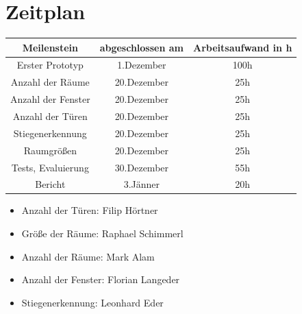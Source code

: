 \documentclass[deutsch]{scrartcl}
\begin{document}
\section{Zeitplan}
\begin{table}[h!]
	\centering
		\begin{tabular}{|c|c|c|}
		\hline
		Meilenstein & abgeschlossen am & Arbeitsaufwand in h\\
		\hline
		Erster Prototyp & 1.Dezember & 100h\\
		Anzahl der Räume & 20.Dezember & 25h\\
		Anzahl der Fenster & 20.Dezember & 25h\\
		Anzahl der Türen & 20.Dezember & 25h\\
		Stiegenerkennung & 20.Dezember & 25h\\
		Raumgrößen & 20.Dezember & 25h\\
		Tests, Evaluierung & 30.Dezember & 55h\\
		Bericht & 3.Jänner & 20h\\
		\hline
		\end{tabular}
\end{table}
\begin{itemize}
	\item Anzahl der Türen: Filip Hörtner \cite{TUW-274401}
	\item Größe der Räume: Raphael Schimmerl \cite{jang18}
	\item Anzahl der Räume: Mark Alam \cite{vargas18}
	\item Anzahl der Fenster: Florian Langeder \cite{or2005highly}
	\item Stiegenerkennung: Leonhard Eder \cite{Dosch2000}

	
\end{itemize}
\end{document}
